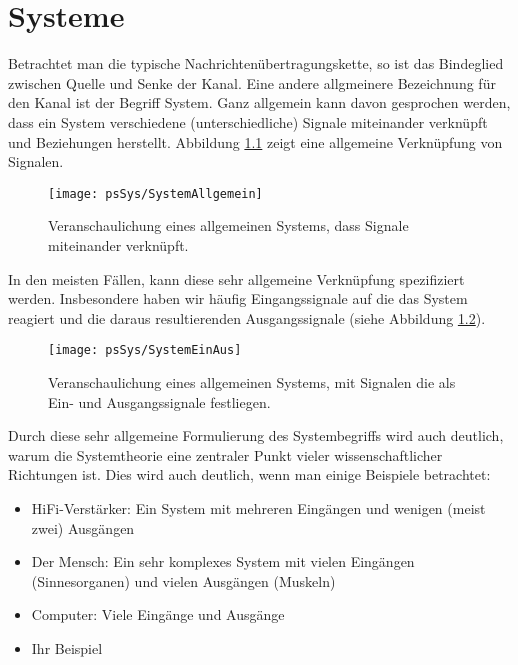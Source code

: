 \chapter{Systeme}
Betrachtet man die typische Nachrichtenübertragungskette, so ist
das Bindeglied zwischen Quelle und Senke der Kanal. Eine andere
allgmeinere Bezeichnung für den Kanal ist der Begriff System. Ganz
allgemein kann davon gesprochen werden, dass ein System
verschiedene (unterschiedliche) Signale miteinander verknüpft und
Beziehungen herstellt. Abbildung \ref{pic:SystembildAllgemein}
zeigt eine allgemeine Verknüpfung von Signalen.

\begin{figure}[h]
\begin{center}
\texttt{[image: psSys/SystemAllgemein]}
\caption{\label{pic:SystembildAllgemein} Veranschaulichung eines
allgemeinen Systems, dass Signale miteinander verknüpft.}
\end{center}
\end{figure}

In den meisten Fällen, kann diese sehr allgemeine Verknüpfung
spezifiziert werden. Insbesondere haben wir häufig Eingangssignale
auf die das System reagiert und die daraus resultierenden
Ausgangssignale (siehe Abbildung \ref{pic:SystembildEinAus}).

\begin{figure}[H]
\begin{center}
\texttt{[image: psSys/SystemEinAus]}
\caption{\label{pic:SystembildEinAus} Veranschaulichung eines
allgemeinen Systems, mit Signalen die als Ein- und Ausgangssignale
festliegen.}
\end{center}
\end{figure}

Durch diese sehr allgemeine Formulierung des Systembegriffs wird
auch deutlich, warum die Systemtheorie eine zentraler Punkt vieler
wissenschaftlicher Richtungen ist. Dies wird  auch deutlich, wenn
man einige Beispiele betrachtet:
\begin{itemize}
    \item HiFi-Verstärker: Ein System mit mehreren Eingängen und
    wenigen (meist zwei) Ausgängen
    \item Der Mensch: Ein sehr komplexes System mit vielen
    Eingängen (Sinnesorganen) und vielen Ausgängen (Muskeln)
    \item Computer: Viele Eingänge und Ausgänge
    \item Ihr Beispiel
\end{itemize}


